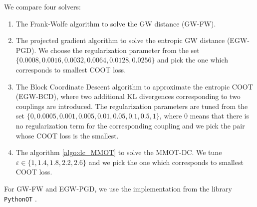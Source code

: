 We compare four solvers:
\begin{enumerate}
  \item The Frank-Wolfe algorithm to solve the GW distance (GW-FW).

  \item The projected gradient algorithm to solve the entropic GW distance \citep{Peyre16} (EGW-PGD).
  We choose the regularization parameter from the set
  $\{0.0008, 0.0016, 0.0032, 0.0064, 0.0128, 0.0256 \}$
  and pick the one which corresponds to smallest COOT loss.

  \item The Block Coordinate Descent algorithm to approximate the entropic COOT \citep{Redko20}
  (EGW-BCD), where two additional KL divergences corresponding to two couplings are introduced.
  The regularization parameters are tuned from the set
  $\{0, 0.0005, 0.001, 0.005, 0.01, 0.05, 0.1, 0.5, 1 \}$,
  where $0$ means that there is no regularization term for the corresponding coupling
  and we pick the pair whose COOT loss is the smallest.

  \item The algorithm \ref{algo:dc_MMOT} to solve the MMOT-DC. We tune
  $\varepsilon \in \{1, 1.4, 1.8, 2.2, 2.6\}$ and we pick the one which corresponds to smallest COOT loss.
\end{enumerate}
For GW-FW and EGW-PGD, we use the implementation from the library \texttt{PythonOT} \citep{Flamary21}.

